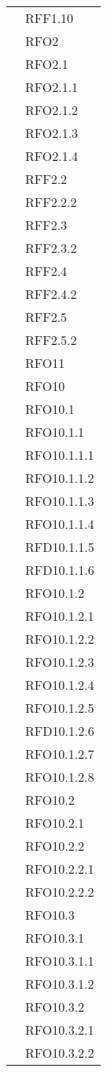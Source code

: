 \begin{longtable}{ p{12cm} | p{4cm} }
		    & RFF1.10 \\
		    & RFO2 \\
		    & RFO2.1 \\
		    & RFO2.1.1 \\
		    & RFO2.1.2 \\
		    & RFO2.1.3 \\
		    & RFO2.1.4 \\
		    & RFF2.2 \\
		    & RFF2.2.2 \\
		    & RFF2.3 \\
		    & RFF2.3.2 \\
		    & RFF2.4 \\
		    & RFF2.4.2 \\
		    & RFF2.5 \\
		    & RFF2.5.2 \\
		    & RFO11 \\
		    & RFO10 \\
& RFO10.1 \\
& RFO10.1.1 \\
& RFO10.1.1.1 \\
& RFO10.1.1.2 \\
& RFO10.1.1.3 \\
& RFO10.1.1.4 \\
& RFD10.1.1.5 \\
& RFD10.1.1.6 \\
& RFO10.1.2 \\
& RFO10.1.2.1 \\
& RFO10.1.2.2 \\
& RFO10.1.2.3 \\
& RFO10.1.2.4 \\
& RFO10.1.2.5 \\
& RFD10.1.2.6 \\
& RFO10.1.2.7 \\
& RFO10.1.2.8 \\
& RFO10.2 \\
& RFO10.2.1 \\
& RFO10.2.2 \\
& RFO10.2.2.1 \\
& RFO10.2.2.2 \\
& RFO10.3 \\
& RFO10.3.1 \\
& RFO10.3.1.1 \\
& RFO10.3.1.2 \\
& RFO10.3.2 \\
& RFO10.3.2.1 \\
& RFO10.3.2.2 \\

\end{longtable}
